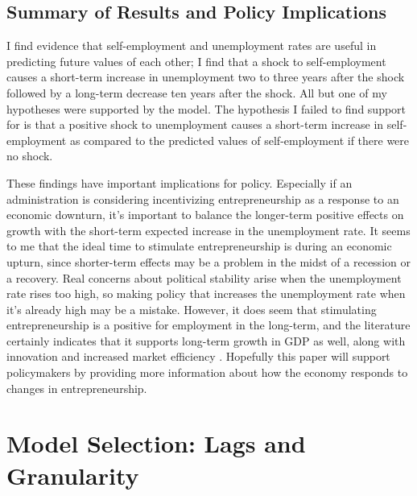 \documentclass[]{ecca}
\begin{document}
\subsection{Summary of Results and Policy Implications}

I find evidence that self-employment and unemployment rates are useful in predicting future values of each other; I find that a shock to self-employment causes a short-term increase in unemployment two to three years after the shock followed by a long-term decrease ten years after the shock. All but one of my hypotheses were supported by the model. The hypothesis I failed to find support for is that a positive shock to unemployment causes a short-term increase in self-employment as compared to the predicted values of self-employment if there were no shock.

These findings have important implications for policy. Especially if an administration is considering incentivizing entrepreneurship as a response to an economic downturn, it's important to balance the longer-term positive effects on growth with the short-term expected increase in the unemployment rate. It seems to me that the ideal time to stimulate entrepreneurship is during an economic upturn, since shorter-term effects may be a problem in the midst of a recession or a recovery. Real concerns about political stability arise when the unemployment rate rises too high, so making policy that increases the unemployment rate when it's already high may be a mistake. However, it does seem that stimulating entrepreneurship is a positive for employment in the long-term, and the literature certainly indicates that it supports long-term growth in GDP as well, along with innovation and increased market efficiency \cite{matejovsky14, dejardin11}. Hopefully this paper will support policymakers by providing more information about how the economy responds to changes in entrepreneurship.


\section{Model Selection: Lags and Granularity}
\end{document}
